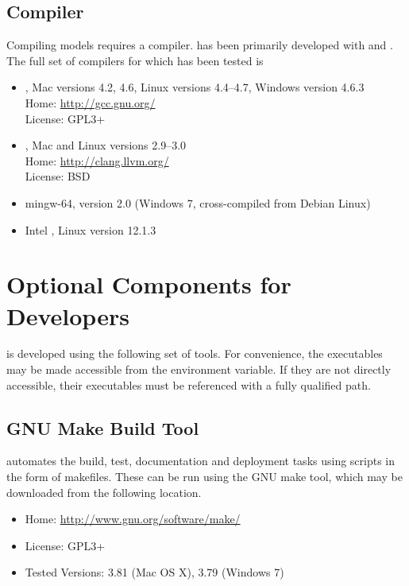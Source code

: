 \subsection{\Cpp Compiler}

Compiling \Stan models requires a \Cpp compiler.  \Stan has been
primarily developed with \clang and \gpp.  The full set of compilers
for which \Stan has been tested is
%
\begin{itemize}
%
\item \gpp, Mac versions 4.2, 4.6, Linux versions 4.4--4.7, Windows
  version 4.6.3
\\
Home: \url{http://gcc.gnu.org/}
\\
License: GPL3+
%
\item \clang, Mac and Linux versions 2.9--3.0
\\
Home: \url{http://clang.llvm.org/}
\\
License: BSD
%
\item mingw-64, version 2.0 (Windows 7, cross-compiled from Debian Linux)
%
\item Intel \Cpp, Linux version 12.1.3
%
\end{itemize}
%

\section{Optional Components for Developers}

\Stan is developed using the following set of tools.  For convenience,
the executables may be made accessible from the 
environment variable.  If they are not directly accessible, their
executables must be referenced with a fully qualified path.


\subsection{GNU Make Build Tool}

\Stan automates the build, test, documentation and deployment tasks
using scripts in the form of makefiles.  These can be run using the
GNU make tool, which may be downloaded from the following
location.
\begin{itemize}
\item Home: \url{http://www.gnu.org/software/make/}
\item License: GPL3+
\item Tested Versions: 3.81 (Mac OS X), 3.79 (Windows 7)
\end{itemize}
%


